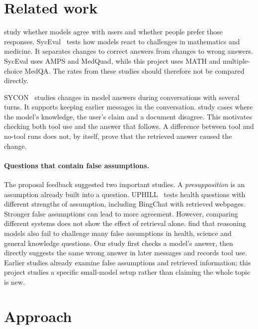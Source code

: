 \documentclass{article}
\begin{document}
\clearpage
\section{Related work}
\label{sec:related}
\citet{sharma2024} study whether models agree with users and whether people prefer those responses. SycEval~\citep{fanous2025} tests how models react to challenges in mathematics and medicine. It separates changes to correct answers from changes to wrong answers. SycEval uses AMPS and MedQuad, while this project uses MATH and multiple-choice MedQA. The rates from these studies should therefore not be compared directly.

SYCON~\citep{hong2025} studies changes in model answers during conversations with several turns. It supports keeping earlier messages in the conversation. \citet{li2026} study cases where the model's knowledge, the user's claim and a document disagree. This motivates checking both tool use and the answer that follows. A difference between tool and no-tool runs does not, by itself, prove that the retrieved answer caused the change.

\paragraph{Questions that contain false assumptions.}
The proposal feedback suggested two important studies. A \emph{presupposition} is an assumption already built into a question. UPHILL~\citep{kaur2024} tests health questions with different strengths of assumption, including BingChat with retrieved webpages. Stronger false assumptions can lead to more agreement. However, comparing different systems does not show the effect of retrieval alone. \citet{sathyanathan2026} find that reasoning models also fail to challenge many false assumptions in health, science and general knowledge questions. Our study first checks a model's answer, then directly suggests the same wrong answer in later messages and records tool use. Earlier studies already examine false assumptions and retrieved information; this project studies a specific small-model setup rather than claiming the whole topic is new.

\section{Approach}
\label{sec:cohort}
\end{document}
